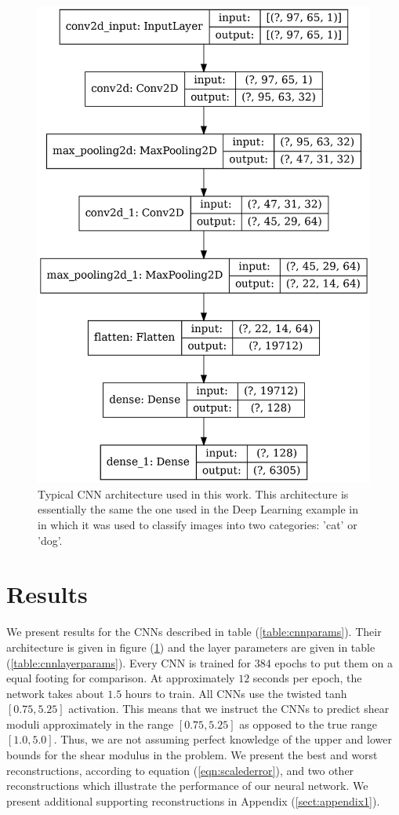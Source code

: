 \documentclass[10pt]{article}
\begin{document}
\begin{figure}[!h] 
   \centering
    \includegraphics[totalheight=9cm]{Figures/typical_cnn.png}
    \caption{\label{fig:typical_cnn}Typical CNN architecture used in this work. This architecture is essentially the same the one used in the Deep Learning example in \cite{misc:udemy} in which it was used to classify images into two categories: 'cat' or 'dog'.}
\end{figure}
%
%
\section{Results}
We present results for the CNNs described in table (\ref{table:cnnparams}). Their architecture is given in figure (\ref{fig:typical_cnn}) and the layer parameters are given in table (\ref{table:cnnlayerparams}). Every CNN is trained for 384 epochs to put them on a equal footing for comparison. At approximately ${12}$ seconds per epoch, the network takes about ${1.5}$ hours to train. All CNNs use the twisted tanh $[0.75,5.25]$ activation. This means that we instruct the CNNs to predict shear moduli approximately in the range $[0.75,5.25]$ as opposed to the true range $[1.0,5.0]$. Thus, we are not assuming perfect knowledge of the upper and lower bounds for the shear modulus in the problem. We present the best and worst reconstructions, according to equation (\ref{eqn:scalederror}), and two other reconstructions which illustrate the performance of our neural network. We present additional supporting reconstructions in Appendix (\ref{sect:appendix1}).
\end{document}
